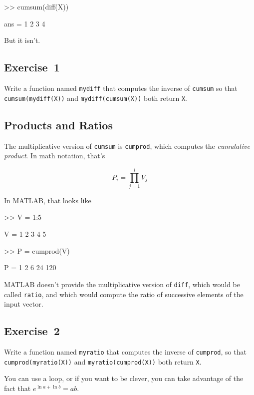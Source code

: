 \begin{code}
>> cumsum(diff(X))

ans = 1     2     3     4
\end{code}

But it isn't.

\subsection{Exercise~1}
Write a function named \lstinline{mydiff} that computes the
inverse of \lstinline{cumsum} so that \lstinline{cumsum(mydiff(X))} and
\lstinline{mydiff(cumsum(X))} both return \lstinline{X}.



\subsection{Products and Ratios}

The multiplicative version of \lstinline{cumsum} is \lstinline{cumprod},
which computes the \emph{cumulative product}.  In math notation,
that's


\begin{equation*}
P_i = \prod_{j=1}^i V_j
\end{equation*}

In MATLAB, that looks like

\begin{code}
>> V = 1:5

V = 1     2     3     4     5

>> P = cumprod(V)

P = 1     2     6    24   120
\end{code}

MATLAB doesn't provide the multiplicative version
of \lstinline{diff}, which would be called \lstinline{ratio}, and which would
compute the ratio of successive elements of the input vector.

\subsection{Exercise~2}
Write a function named \lstinline{myratio} that computes the
inverse of \lstinline{cumprod}, so that \lstinline{cumprod(myratio(X))} and
\lstinline{myratio(cumprod(X))} both
return \lstinline{X}.

You can use a loop, or if you want to be clever, you can take
advantage of the fact that $e^{\ln a + \ln b} = a b$.

